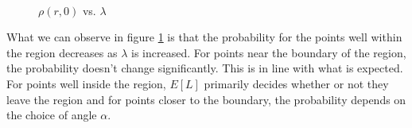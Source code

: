 \begin{figure}[ht!]
     \begin{center}
%
        \\ %

%
    \end{center}
	\caption[$\rho(r,0)$ vs. $\lambda$]{\small $\rho(r,0)$ vs. $ \lambda$}%
   \label{fig:vslambda}
\end{figure}
What we can observe in figure \ref{fig:vslambda} is that the probability for the points well within the region decreases as $\lambda$ is increased. For points near the boundary of the region, the probability doesn't change significantly. This is in line with what is expected. For points well inside the region, $E[L]$ primarily decides whether or not they leave the region and for points closer to the boundary, the probability depends on the choice of angle $\alpha$.
